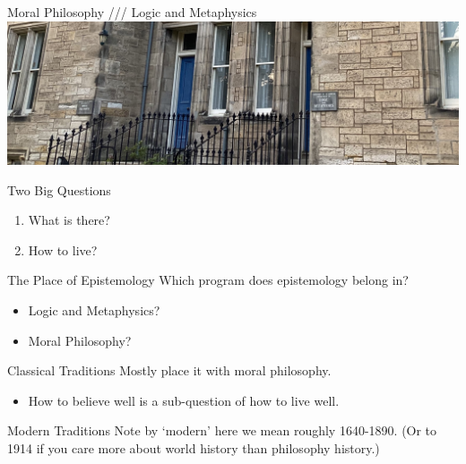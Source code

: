 \documentclass[
  17pt,
  letterpaper,
  ignorenonframetext,
  aspectratio=169,
]{beamer}
\providecommand{\tightlist}{%
  \setlength{\itemsep}{0pt}\setlength{\parskip}{0pt}}\usepackage{longtable,booktabs,array}
\begin{document}
\begin{frame}{Moral Philosophy /// Logic and Metaphysics}
\protect\hypertarget{moral-philosophy-logic-and-metaphysics}{}
\includegraphics{../images/edgecliffe-doors.jpg}
\end{frame}

\begin{frame}{Two Big Questions}
\protect\hypertarget{two-big-questions}{}
\begin{enumerate}[<+->]
\tightlist
\item
  What is there?
\item
  How to live?
\end{enumerate}
\end{frame}

\begin{frame}{The Place of Epistemology}
\protect\hypertarget{the-place-of-epistemology-1}{}
Which program does epistemology belong in?

\begin{itemize}[<+->]
\tightlist
\item
  Logic and Metaphysics?
\item
  Moral Philosophy?
\end{itemize}
\end{frame}

\begin{frame}{Classical Traditions}
\protect\hypertarget{classical-traditions}{}
Mostly place it with moral philosophy.

\begin{itemize}[<+->]
\tightlist
\item
  How to believe well is a sub-question of how to live well.
\end{itemize}
\end{frame}

\begin{frame}{Modern Traditions}
\protect\hypertarget{modern-traditions}{}
Note by `modern' here we mean roughly 1640-1890. (Or to 1914 if you care
more about world history than philosophy history.)
\end{frame}
\end{document}
